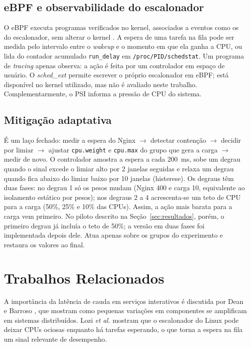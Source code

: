\documentclass[12pt,a4paper]{article}
\begin{document}
\subsection{eBPF e observabilidade do escalonador}
O eBPF executa programas verificados no kernel, associados a eventos como os do escalonador, sem alterar o
kernel \cite{gregg2019bpf}. A espera de uma tarefa na fila pode ser medida pelo intervalo entre o
\textit{wakeup} e o momento em que ela ganha a CPU, ou lida do contador acumulado \texttt{run\_delay} em
\texttt{/proc/PID/schedstat}. Um programa de \textit{tracing} apenas observa: a ação é feita por um
controlador em espaço de usuário. O \textit{sched\_ext} \cite{schedext} permite escrever o próprio escalonador
em eBPF; está disponível no kernel utilizado, mas não é avaliado neste trabalho. Complementarmente, o PSI
\cite{psi} informa a pressão de CPU do sistema.

\subsection{Mitigação adaptativa}
É um laço fechado: medir a espera do Nginx $\rightarrow$ detectar contenção $\rightarrow$ decidir por limiar
$\rightarrow$ ajustar \texttt{cpu.weight} e \texttt{cpu.max} do grupo que gera a carga $\rightarrow$ medir de
novo. O controlador amostra a espera a cada 200~ms, sobe um degrau quando o sinal excede o limiar alto por 2
janelas seguidas e relaxa um degrau quando fica abaixo do limiar baixo por 10 janelas (histerese). Os degraus
têm duas fases: no degrau 1 só os pesos mudam (Nginx 400 e carga 10, equivalente ao isolamento estático por
pesos); nos degraus 2 a 4 acrescenta-se um teto de CPU para a carga (50\%, 25\% e 10\% das CPUs). Assim, a ação
mais barata para a carga vem primeiro. No piloto descrito na Seção~\ref{sec:resultados}, porém, o primeiro
degrau já incluía o teto de 50\%; a versão em duas fases foi implementada depois dele. Atua apenas sobre os grupos do experimento e restaura os valores ao final.

\section{Trabalhos Relacionados}

A importância da latência de cauda em serviços interativos é discutida por Dean e Barroso
\cite{dean2013tail}, que mostram como pequenas variações em componentes se amplificam em sistemas
distribuídos. Lozi \textit{et al.} \cite{lozi2016wasted} mostram que o escalonador do Linux pode deixar CPUs
ociosas enquanto há tarefas esperando, o que torna a espera na fila um sinal relevante de desempenho.
\end{document}
